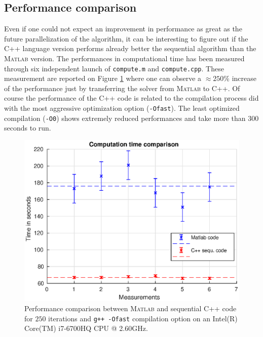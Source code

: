 \documentclass{article}
\begin{document}
\subsection{Performance comparison}
Even if one could not expect an improvement in performance as great as the future parallelization of the algorithm, it can be interesting to figure out if the C++ language version performs already better the sequential algorithm than the \textsc{Matlab} version. The performances in computational time has been measured through six independent launch of \texttt{compute.m} and \texttt{compute.cpp}. These measurement are reported on Figure \ref{fig:perform_comparison_sequ} where one can observe a $\approx 250\%$ increase of the performance just by transferring the solver from \textsc{Matlab} to C++. Of course the performance of the C++ code is related to the compilation process did with the most aggressive optimization option (\texttt{-Ofast}). The least optimized compilation (\texttt{-O0}) shows extremely reduced performances and take more than $300$ seconds to run.
\begin{figure}[h!]
	\centering
	\includegraphics[width=0.7\linewidth]{../figures/perform_comparison_sequ}
	\caption{Performance comparison between \textsc{Matlab} and sequential C++ code for $250$ iterations and \texttt{g++ -Ofast} compilation option on an Intel(R) Core(TM) i7-6700HQ CPU @ 2.60GHz.}
	\label{fig:perform_comparison_sequ}
\end{figure}
\end{document}
